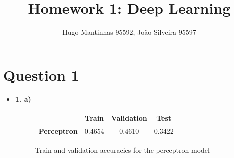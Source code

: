\documentclass[12pt]{article}
\begin{document}
\title{Homework 1: Deep Learning}
\author{Hugo Mantinhas 95592, João Silveira 95597}

\maketitle

\section*{Question 1}
\begin{itemize}
    \item \textbf{1. a)}
    \begin{figure}[h]
        \centering
        \begin{tabular}{|c|c|c|c|}
            \toprule
            & \textbf{Train} & \textbf{Validation} & \textbf{Test} \\
            \midrule
            \textbf{Perceptron} & 0.4654 & 0.4610 & 0.3422 \\
            \bottomrule
        \end{tabular}
        \caption{Train and validation accuracies for the perceptron model}
    \end{figure}


\end{itemize}
\end{document}
